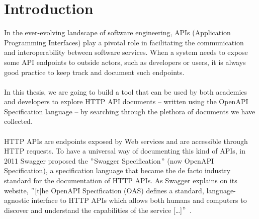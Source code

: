 \chapter{Introduction}\label{ch:introduction}
In the ever-evolving landscape of software engineering, APIs (Application Programming Interfaces) play a pivotal role in facilitating the communication and interoperability between software services.
When a system needs to expose some API endpoints to outside actors, such as developers or users, it is always good practice to keep track and document such endpoints. \\ \\
In this thesis, we are going to build a tool that can be used by both academics and developers to explore HTTP API documents -- written using the OpenAPI Specification language -- by searching through the plethora of documents we have collected. \\ \\
HTTP APIs are endpoints exposed by Web services and are accessible through HTTP requests.
To have a universal way of documenting this kind of APIs, in 2011 Swagger proposed the \("\)Swagger Specification\("\) (now OpenAPI Specification), a specification language that became the de facto industry standard for the documentation of HTTP APIs. As Swagger explains on its website, \("\)[t]he OpenAPI Specification (OAS) defines a standard, language-agnostic interface to HTTP APIs which allows both humans and computers to discover and understand the capabilities of the service [\dots]\("\)~\cite{noauthor_openapi_nodate}.





